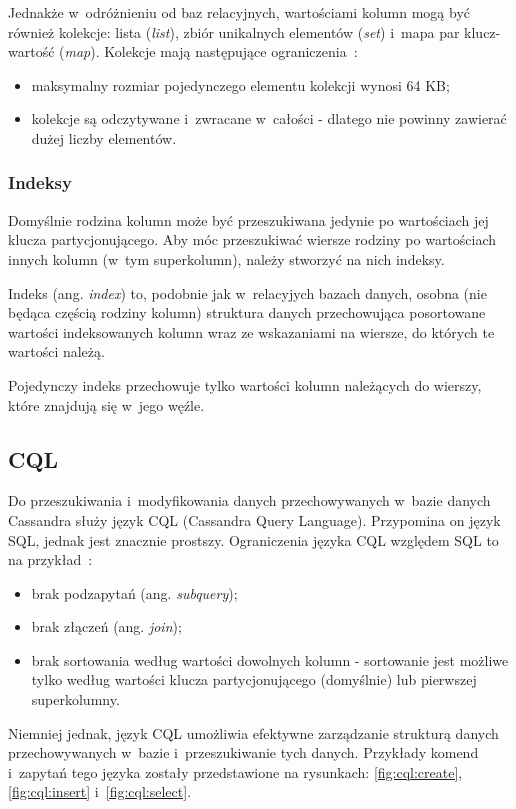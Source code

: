 Jednakże w~odróżnieniu od baz relacyjnych, wartościami kolumn mogą być również kolekcje: lista (\emph{list}), zbiór unikalnych elementów (\emph{set}) i~mapa par klucz-wartość (\emph{map}).
Kolekcje mają następujące ograniczenia~\cite{cassandra:collections}:

\begin{itemize}
 \item maksymalny rozmiar pojedynczego elementu kolekcji wynosi 64 KB;
 \item kolekcje są odczytywane i~zwracane w~całości - dlatego nie powinny zawierać dużej liczby elementów.
\end{itemize}

\subsubsection{Indeksy}

Domyślnie rodzina kolumn może być przeszukiwana jedynie po wartościach jej klucza partycjonującego.
Aby móc przeszukiwać wiersze rodziny po wartościach innych kolumn (w~tym superkolumn), należy stworzyć na nich indeksy.

Indeks (ang. \emph{index}) to, podobnie jak w~relacyjych bazach danych, osobna (nie będąca częścią rodziny kolumn) struktura danych przechowująca posortowane wartości indeksowanych kolumn wraz ze wskazaniami na wiersze, do których te wartości należą.

Pojedynczy indeks przechowuje tylko wartości kolumn należących do wierszy, które znajdują się w~jego węźle.


\subsection{CQL}

Do przeszukiwania i~modyfikowania danych przechowywanych w~bazie danych Cassandra służy język CQL (Cassandra Query Language).
Przypomina on język SQL, jednak jest znacznie prostszy.
Ograniczenia języka CQL względem SQL to na przykład~\cite{cassandra_3_0}:

\begin{itemize}
 \item brak podzapytań (ang. \emph{subquery});
 \item brak złączeń (ang. \emph{join});
 \item brak sortowania według wartości dowolnych kolumn - sortowanie jest możliwe tylko według wartości klucza partycjonującego (domyślnie) lub pierwszej superkolumny.
\end{itemize}

Niemniej jednak, język CQL umożliwia efektywne zarządzanie strukturą danych przechowywanych w~bazie i~przeszukiwanie tych danych.
Przykłady komend i~zapytań tego języka zostały przedstawione na rysunkach: \ref{fig:cql:create}, \ref{fig:cql:insert} i~\ref{fig:cql:select}.






